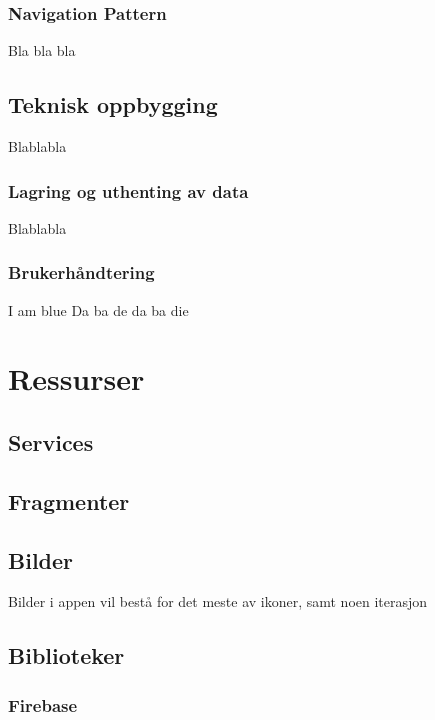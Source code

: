 \subsubsection{Navigation Pattern}
Bla bla bla

\subsection{Teknisk oppbygging}
Blablabla

\subsubsection{Lagring og uthenting av data}
Blablabla

\subsubsection{Brukerhåndtering}
I am blue
Da ba de da ba die

\section{Ressurser}
\subsection{Services}


\subsection{Fragmenter}

\subsection{Bilder}
Bilder i appen vil bestå for det meste av ikoner, samt noen iterasjon 

\subsection{Biblioteker}
\subsubsection{Firebase}